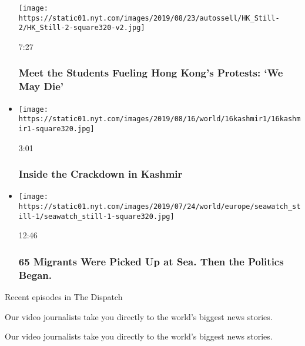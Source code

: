 \begin{itemize}
  \texttt{[image: https://static01.nyt.com/images/2019/08/23/autossell/HK\_Still-2/HK\_Still-2-square320-v2.jpg]}

  7:27

  \hypertarget{meet-the-students-fueling-hong-kongs-protests-we-may-die}{%
  \subsubsection{Meet the Students Fueling Hong Kong's Protests: `We May
  Die'}\label{meet-the-students-fueling-hong-kongs-protests-we-may-die}}
\item
  \href{https://www.nytimes.com/video/world/asia/100000006653817/kashmir-india-pakistan.html?action=click\&module=video-series-bar\&region=header\&pgtype=Article\&playlistId=video/on-the-ground}{}

  \texttt{[image: https://static01.nyt.com/images/2019/08/16/world/16kashmir1/16kashmir1-square320.jpg]}

  3:01

  \hypertarget{inside-the-crackdown-in-kashmir}{%
  \subsubsection{Inside the Crackdown in
  Kashmir}\label{inside-the-crackdown-in-kashmir}}
\item
  \href{https://www.nytimes.com/video/world/europe/100000006498001/seawatch-migrants-europe.html?action=click\&module=video-series-bar\&region=header\&pgtype=Article\&playlistId=video/on-the-ground}{}

  \texttt{[image: https://static01.nyt.com/images/2019/07/24/world/europe/seawatch\_still-1/seawatch\_still-1-square320.jpg]}

  12:46

  \hypertarget{65-migrants-were-picked-up-at-sea-then-the-politics-began}{%
  \subsubsection{65 Migrants Were Picked Up at Sea. Then the Politics
  Began.}\label{65-migrants-were-picked-up-at-sea-then-the-politics-began}}
\end{itemize}

Recent episodes in The Dispatch

Our video journalists take you directly to the world's biggest news
stories.

Our video journalists take you directly to the world's biggest news
stories.


